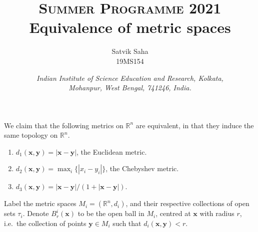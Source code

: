 \documentclass[11pt]{article}
\title{
    \Large\textsc{Summer Programme 2021} \\
    \vspace{10pt}
    \huge Equivalence of metric spaces \\
}
\author{
    \large Satvik Saha%
    \\\textsc{\small 19MS154}
}
\date{\normalsize
    \textit{Indian Institute of Science Education and Research, Kolkata, \\
    Mohanpur, West Bengal, 741246, India.} \\
}
\def\R{\mathbb{R}}
\renewcommand\vec\boldsymbol
\def\vx{\vec{x}}
\def\vy{\vec{y}}
\theoremstyle{remark}
\begin{document}
    \maketitle
    
    We claim that the following metrics on $\R^n$ are equivalent, in that they
    induce the same topology on $\R^n$.
    \begin{enumerate}
        \item $d_1(\vx, \vy) = |\vx - \vy|$, the Euclidean metric.
        \item $d_2(\vx, \vy) = \max_i\{|x_i - y_i|\}$, the Chebyshev metric.
        \item $d_3(\vx, \vy) = |\vx - \vy| / (1 + |\vx - \vy|)$.
    \end{enumerate}
    Label the metric spaces $M_i = (\R^n, d_i)$, and their respective collections of
    open sets $\tau_i$. Denote $B^i_r(\vx)$ to be the open ball in $M_i$, centred at
    $\vx$ with radius $r$, i.e.\ the collection of points $\vy \in M_i$ such that
    $d_i(\vx, \vy) < r$.
\end{document}
